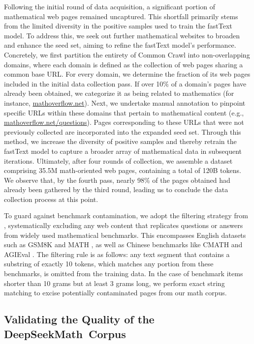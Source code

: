 Following the initial round of data acquisition, a significant portion of mathematical web pages remained uncaptured. This shortfall primarily stems from the limited diversity in the positive samples used to train the fastText model. To address this, we seek out further mathematical websites to broaden and enhance the seed set, aiming to refine the fastText model’s performance. Concretely, we first partition the entirety of Common Crawl into non-overlapping domains, where each domain is defined as the collection of web pages sharing a common base URL. For every domain, we determine the fraction of its web pages included in the initial data collection pass. If over 10\% of a domain’s pages have already been obtained, we categorize it as being related to mathematics (for instance, \url{mathoverflow.net}). Next, we undertake manual annotation to pinpoint specific URLs within these domains that pertain to mathematical content (e.g., \url{mathoverflow.net/questions}). Pages corresponding to these URLs that were not previously collected are incorporated into the expanded seed set. Through this method, we increase the diversity of positive samples and thereby retrain the fastText model to capture a broader array of mathematical data in subsequent iterations. Ultimately, after four rounds of collection, we assemble a dataset comprising 35.5M math-oriented web pages, containing a total of 120B tokens. We observe that, by the fourth pass, nearly 98\% of the pages obtained had already been gathered by the third round, leading us to conclude the data collection process at this point.

To guard against benchmark contamination, we adopt the filtering strategy from \cite{deepseek-coder}, systematically excluding any web content that replicates questions or answers from widely used mathematical benchmarks. This encompasses English datasets such as GSM8K \citep{gsm8k} and MATH \citep{MATH}, as well as Chinese benchmarks like CMATH \citep{wei2023cmath} and AGIEval \citep{agieval}. The filtering rule is as follows: any text segment that contains a substring of exactly 10 tokens, which matches any portion from these benchmarks, is omitted from the training data. In the case of benchmark items shorter than 10 grams but at least 3 grams long, we perform exact string matching to excise potentially contaminated pages from our math corpus.

\subsection{Validating the Quality of the DeepSeekMath~Corpus}

